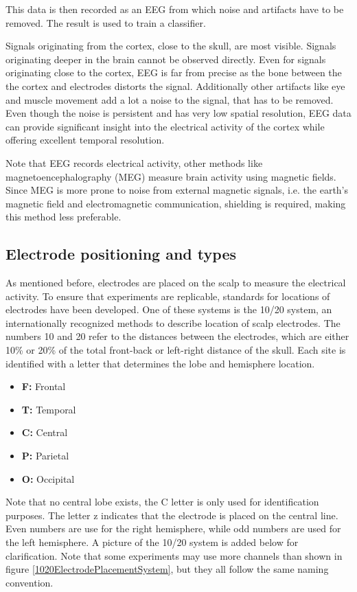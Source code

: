 This data is then recorded as an EEG from which noise and artifacts have to be removed. The result is used to train a classifier. 

\npar

Signals originating from the cortex, close to the skull, are most visible. Signals originating deeper in the brain cannot be observed directly. Even for signals originating close to the cortex, EEG is far from precise as the bone between the the cortex and electrodes distorts the signal. Additionally other artifacts like eye and muscle movement add a lot a noise to the signal, that has to be removed. Even though the noise is persistent and has very low spatial resolution, EEG data can provide significant insight into the electrical activity of the cortex while offering excellent temporal resolution\cite{GivenPaper}.

\npar

Note that EEG records electrical activity, other methods like magnetoencephalography (MEG) measure brain activity using magnetic fields. Since MEG is more prone to noise from external magnetic signals, i.e. the earth's magnetic field and electromagnetic communication, shielding is required, making this method less preferable.

\subsection{Electrode positioning and types}
As mentioned before, electrodes are placed on the scalp to measure the electrical activity. To ensure that experiments are replicable, standards for locations of electrodes have been developed. One of these systems is the 10/20 system, an internationally recognized methods to describe location of scalp electrodes\cite{TenTwentyManual}. The numbers 10 and 20 refer to the distances between the electrodes, which are either 10\% or 20\% of the total front-back or left-right distance of the skull. Each site is identified with a letter that determines the lobe and hemisphere location.
\begin{itemize}
\item \textbf{F:} Frontal
\item \textbf{T:} Temporal
\item \textbf{C:} Central
\item \textbf{P:} Parietal
\item \textbf{O:} Occipital
\end{itemize}
Note that no central lobe exists, the C letter is only used for identification purposes. The letter z indicates that the electrode is placed on the central line. Even numbers are use for the right hemisphere, while odd numbers are used for the left hemisphere. A picture of the 10/20 system is added below for clarification. Note that some experiments may use more channels than shown in figure \ref{1020ElectrodePlacementSystem}, but they all follow the same naming convention.

